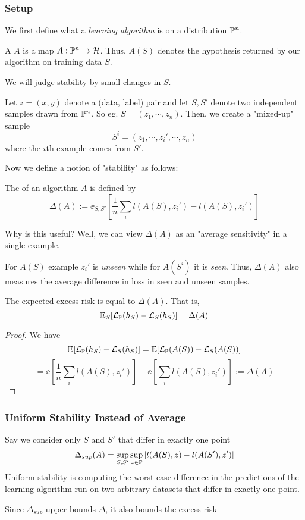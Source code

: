\documentclass[11pt]{scrartcl}
\begin{document}
\subsubsection{Setup}

We first define what a \textit{learning algorithm} is on a distribution $\mathbb{P}^n$. 
\begin{defn}
A  $A$ is a map $A: \mathbb{P}^n \to \mathcal{H}$. Thus, $A(S)$ denotes the hypothesis returned by our algorithm on training data $S$. 
\end{defn}

We will judge stability by small changes in $S$. 

\begin{idea}
Let $z=(x,y)$ denote a (data, label) pair and let $S,S'$ denote two independent samples drawn from $\mathbb{P}^n$. So eg. $S=(z_1,\cdots,z_n)$. Then, we create a "mixed-up" sample $$S^{i}=(z_1,\cdots,z_i',\cdots,z_n)$$ where the $i$th example comes from $S'$. 
\end{idea}

Now we define a notion of "stability" as follows:
\begin{defn}
The  of an algorithm $A$ is defined by $$\Delta(A) := \ee_{S,S'}\left[\frac{1}{n}\sum_{i}l(A(S),z_i')-l(A(S),z_i')\right]$$
\end{defn}

Why is this useful? Well, we can view $\Delta(A)$ as an "average sensitivity" in a single example. 

For $A(S)$ example $z_i'$ is \textit{unseen} while for $A(S^i)$ it is \textit{seen}. Thus, $\Delta(A)$ also measures the average difference in loss in seen and unseen samples. 

\begin{prop}
The expected excess risk is equal to $\Delta(A)$. That is, $$\mathbb{E}_{S}[\mathcal{L}_{\mathbb{P}}(h_S)-\mathcal{L}_S(h_S)]=\Delta(A)$$
\end{prop}
\begin{proof}
We have $$\mathbb{E}[\mathcal{L}_{\mathbb{P}}(h_S)-\mathcal{L}_S(h_S)]=\mathbb{E}[\mathcal{L}_{\mathbb{P}}(A(S))-\mathcal{L}_{S}(A(S))]$$
$$=\ee\left[\frac{1}{n}\sum_{i}l(A(S),z_i')\right]-\ee\left[\sum_{i}l(A(S),z_i')\right] := \Delta(A)$$
\end{proof}

\subsubsection{Uniform Stability Instead of Average}
Say we consider only $S$ and $S'$ that differ in exactly one point $$\Delta_{sup}(A)=\sup_{S,S'}\sup_{z \in \mathbb{P}}|l(A(S),z)-l(A(S'),z')|$$
Uniform stability is computing the worst case difference in the predictions of the
learning algorithm run on two arbitrary datasets that differ in exactly one point.
\begin{remark}
Since $\Delta_{sup}$ upper bounds $\Delta$, it also bounds the excess risk
\end{remark}
\end{document}
